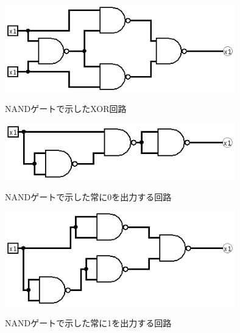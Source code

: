\documentclass[a4paper,11pt,titlepage]{jarticle}
\begin{document}
\par
\begin{figure}[htbp]
  \centering
  \includegraphics[width=100mm]{sample8.png}
  \label{sample5}\\
  \caption{NANDゲートで示したXOR回路}
\end{figure}
\par
\begin{figure}[htbp]
  \centering
  \includegraphics[width=100mm]{sample14.png}
  \label{sample6}\\
  \caption{NANDゲートで示した常に0を出力する回路}
\end{figure}
\par
\begin{figure}[htbp]
  \centering
  \includegraphics[width=100mm]{sample15.png}
  \label{sample7}\\
  \caption{NANDゲートで示した常に1を出力する回路}
\end{figure}
\par
\end{document}
